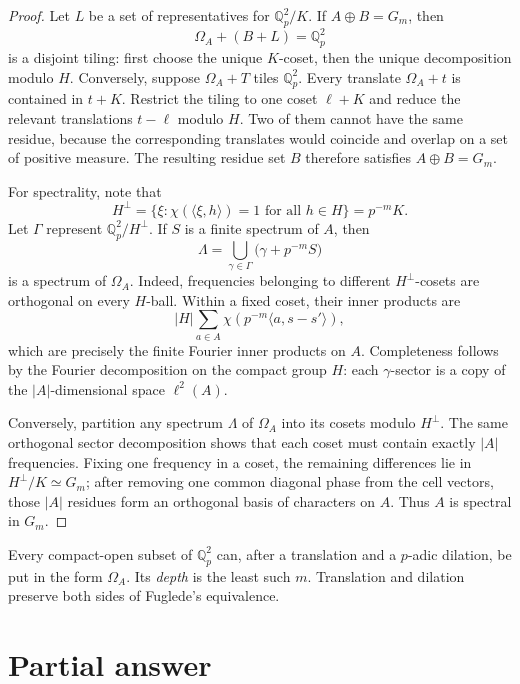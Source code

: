 \documentclass[11pt]{article}
\newcommand{\Qp}{\mathbb Q_p}
\newcommand{\Gm}{G_m}
\begin{document}
\begin{proof}
Let $L$ be a set of representatives for $\Qp^2/K$.  If
$A\oplus B=\Gm$, then
\[
 \Omega_A+(B+L)=\Qp^2
\]
is a disjoint tiling: first choose the unique $K$-coset, then the unique
decomposition modulo $H$.  Conversely, suppose $\Omega_A+T$ tiles
$\Qp^2$.  Every translate $\Omega_A+t$ is contained in $t+K$.
Restrict the tiling to one coset $\ell+K$ and reduce the relevant
translations $t-\ell$ modulo $H$.  Two of them cannot have the same residue,
because the corresponding translates would coincide and overlap on a set of
positive measure.  The resulting residue set $B$ therefore satisfies
$A\oplus B=\Gm$.

For spectrality, note that
\[
 H^\perp=\{\xi:\chi(\langle\xi,h\rangle)=1\text{ for all }h\in H\}
          =p^{-m}K.
\]
Let $\Gamma$ represent $\Qp^2/H^\perp$.  If $S$ is a finite spectrum of
$A$, then
\[
 \Lambda=\bigcup_{\gamma\in\Gamma}
          \bigl(\gamma+p^{-m}S\bigr)                                  \tag{1}
\]
is a spectrum of $\Omega_A$.  Indeed, frequencies belonging to different
$H^\perp$-cosets are orthogonal on every $H$-ball.  Within a fixed coset,
their inner products are
\[
 |H|\sum_{a\in A}
 \chi\!\left(p^{-m}\langle a,s-s'\rangle\right),
\]
which are precisely the finite Fourier inner products on $A$.  Completeness
follows by the Fourier decomposition on the compact group $H$: each
$\gamma$-sector is a copy of the $|A|$-dimensional space $\ell^2(A)$.

Conversely, partition any spectrum $\Lambda$ of $\Omega_A$ into its cosets
modulo $H^\perp$.  The same orthogonal sector decomposition shows that each
coset must contain exactly $|A|$ frequencies.  Fixing one frequency in a
coset, the remaining differences lie in
$H^\perp/K\simeq\Gm$; after removing one common diagonal phase from the
cell vectors, those $|A|$ residues form an orthogonal basis of characters on
$A$.  Thus $A$ is spectral in $\Gm$.
\end{proof}

Every compact-open subset of $\Qp^2$ can, after a translation and a
$p$-adic dilation, be put in the form $\Omega_A$.  Its \emph{depth} is the
least such $m$.  Translation and dilation preserve both sides of Fuglede's
equivalence.

\section*{Partial answer}
\end{document}
